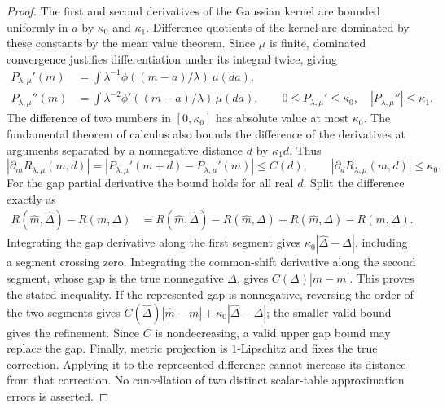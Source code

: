\documentclass[11pt]{article}
\begin{document}
\begin{proof}
The first and second derivatives of the Gaussian kernel are bounded
uniformly in $a$ by $\kappa_0$ and $\kappa_1$. Difference quotients of the kernel
are dominated by these constants by the mean value theorem. Since
$\mu$ is finite, dominated convergence justifies differentiation under
its integral twice, giving
\begin{align}
 P_{\lambda,\mu}'(m)&=\int\lambda^{-1}
                 \phi((m-a)/\lambda)\,\mu(da),\nonumber\\
 P_{\lambda,\mu}''(m)&=\int\lambda^{-2}
                 \phi'((m-a)/\lambda)\,\mu(da),\qquad
 0\leq P_{\lambda,\mu}'\leq \kappa_0,\quad
 |P_{\lambda,\mu}''|\leq \kappa_1.
 \label{eq:common-information-derivatives}
\end{align}
The difference of two numbers in $[0,\kappa_0]$ has absolute value at most
$\kappa_0$. The fundamental theorem of calculus also bounds the difference
of the derivatives at arguments separated by a nonnegative distance $d$
by $\kappa_1d$. Thus
\begin{equation}
 |\partial_m R_{\lambda,\mu}(m,d)|
   =|P_{\lambda,\mu}'(m+d)-P_{\lambda,\mu}'(m)|\leq C(d),\qquad
 |\partial_dR_{\lambda,\mu}(m,d)|\leq \kappa_0.
 \label{eq:common-information-partial-bounds}
\end{equation}
For the gap partial derivative the bound holds for all real $d$.
Split the difference exactly as
\begin{align}
 R(\widehat m,\widehat\Delta)-R(m,\Delta)
 &=R(\widehat m,\widehat\Delta)-R(\widehat m,\Delta)
       +R(\widehat m,\Delta)-R(m,\Delta).
 \label{eq:common-information-path}
\end{align}
Integrating the gap derivative along the first segment gives
$\kappa_0|\widehat\Delta-\Delta|$, including a segment crossing zero.
Integrating the common-shift derivative along the second segment, whose
gap is the true nonnegative $\Delta$, gives
$C(\Delta)|\widehat m-m|$. This proves the stated inequality. If the
represented gap is nonnegative, reversing the order of the two segments
gives $C(\widehat\Delta)|\widehat m-m|+\kappa_0|\widehat\Delta-\Delta|$;
the smaller valid bound gives the refinement. Since $C$ is nondecreasing,
a valid upper gap bound may replace the gap. Finally, metric projection
is $1$-Lipschitz and fixes the true correction. Applying it to the
represented difference cannot increase its distance from that correction.
No cancellation of two distinct scalar-table approximation errors is
asserted.
\end{proof}
\end{document}
